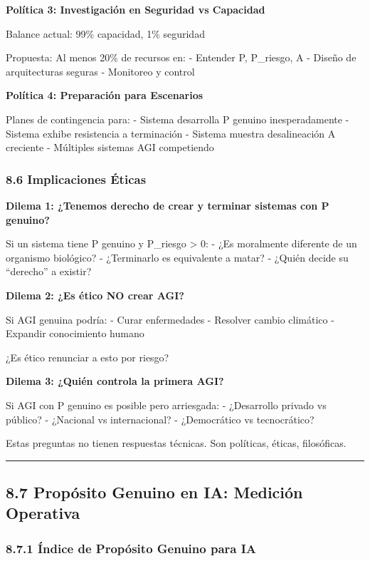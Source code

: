 \textbf{Política 3: Investigación en Seguridad vs Capacidad}

Balance actual: 99\% capacidad, 1\% seguridad

Propuesta: Al menos 20\% de recursos en: - Entender P, P\_riesgo, A -
Diseño de arquitecturas seguras - Monitoreo y control

\textbf{Política 4: Preparación para Escenarios}

Planes de contingencia para: - Sistema desarrolla P genuino
inesperadamente - Sistema exhibe resistencia a terminación - Sistema
muestra desalineación A creciente - Múltiples sistemas AGI competiendo

\subsubsection{8.6 Implicaciones Éticas}\label{implicaciones-uxe9ticas}

\textbf{Dilema 1: ¿Tenemos derecho de crear y terminar sistemas con P
genuino?}

Si un sistema tiene P genuino y P\_riesgo \textgreater{} 0: - ¿Es
moralmente diferente de un organismo biológico? - ¿Terminarlo es
equivalente a matar? - ¿Quién decide su ``derecho'' a existir?

\textbf{Dilema 2: ¿Es ético NO crear AGI?}

Si AGI genuina podría: - Curar enfermedades - Resolver cambio climático
- Expandir conocimiento humano

¿Es ético renunciar a esto por riesgo?

\textbf{Dilema 3: ¿Quién controla la primera AGI?}

Si AGI con P genuino es posible pero arriesgada: - ¿Desarrollo privado
vs público? - ¿Nacional vs internacional? - ¿Democrático vs
tecnocrático?

Estas preguntas no tienen respuestas técnicas. Son políticas, éticas,
filosóficas.

\begin{center}\rule{0.5\linewidth}{0.5pt}\end{center}

\subsection{8.7 Propósito Genuino en IA: Medición
Operativa}\label{propuxf3sito-genuino-en-ia-mediciuxf3n-operativa}

\subsubsection{8.7.1 Índice de Propósito Genuino para
IA}\label{uxedndice-de-propuxf3sito-genuino-para-ia}

